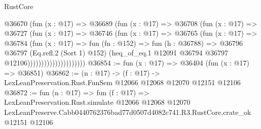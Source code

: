 \begin{lexlean}{RustCore}
\begin{coremodule}
                            @36670
                              (fun (x : @17) =>
                              @36689
                                (fun (x : @17) =>
                                @36708
                                  (fun (x : @17) =>
                                  @36727
                                    (fun (x : @17) =>
                                    @36746
                                      (fun (x : @17) =>
                                      @36765
                                        (fun (x : @17) =>
                                        @36784
                                          (fun (x : @17) =>
                                          fun (fn : @152) =>
                                          fun (h : @36788) =>
                                          @36796
                                            @36797
                                            (Eq.refl.{2} (Sort 1) @152)
                                            (heq_of_eq.{1}
                                              @12091
                                              @36794
                                              @36797
                                              @12106)))))))))))))))))))))
@36854 := fun (x : @17) => @36404 (fun (x : @17) => @36851)
@36862 := (n : @17) ->
  (f : @17) -> LexLeanPreservation.Rust.FunSem @12066 @12068 @12070 @12151 @12106
@36872 := fun (n : @17) =>
  fun (f : @17) =>
  LexLeanPreservation.Rust.simulate
    @12066
    @12068
    @12070
    LexLeanPreserve.Cabb0440762376bad77d0507d4082c741.R3.RustCore.crate_ok
    @12151
    @12106
\end{coremodule}
\end{lexlean}
